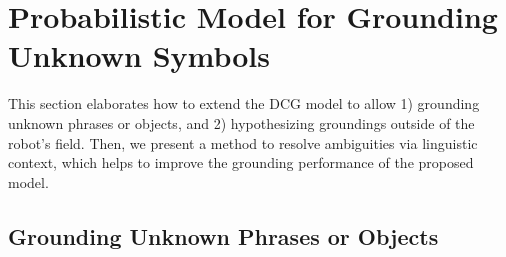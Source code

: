 \section{Probabilistic Model for Grounding Unknown Symbols} \label{sec:technical}

This section elaborates how to extend the DCG model to allow 1) grounding unknown phrases or objects, and 2) hypothesizing groundings outside of the robot's field. Then, we present a method to resolve ambiguities via linguistic context, which helps to improve the grounding performance of the proposed model.

\subsection{Grounding Unknown Phrases or Objects}





